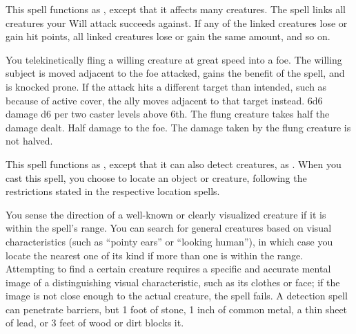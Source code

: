 \spelleffect This spell functions as , except that it affects many creatures. The spell links all creatures your Will attack succeeds against. If any of the linked creatures lose or gain hit points, all linked creatures lose or gain the same amount, and so on.

\spelleffect You telekinetically fling a willing creature at great speed into a foe. The willing subject is moved adjacent to the foe attacked, gains the benefit of the  spell, and is knocked prone. If the attack hits a different target than intended, such as because of active cover, the ally moves adjacent to that target instead.
\spellsuccess 6d6 damage \add d6 per two caster levels above 6th. The flung creature takes half the damage dealt.
\spellfailure Half damage to the foe. The damage taken by the flung creature is not halved.

\spellrng{\rngext}
\spelldur{\durlong \dismissable}
\spelleffect This spell functions as , except that it can also detect creatures, as . When you cast this spell, you choose to locate an object or creature, following the restrictions stated in the respective location spells.

\spellrng{\rngmed}
\spelldur{\durmed \dismissable}
\spelleffect You sense the direction of a well-known or clearly visualized creature if it is within the spell's range. You can search for general creatures based on visual characteristics (such as ``pointy ears'' or ``looking human''), in which case you locate the nearest one of its kind if more than one is within the range. Attempting to find a certain creature requires a specific and accurate mental image of a distinguishing visual characteristic, such as its clothes or face; if the image is not close enough to the actual creature, the spell fails.
\spellnotes A detection spell can penetrate barriers, but 1 foot of stone, 1 inch of common metal, a thin sheet of lead, or 3 feet of wood or dirt blocks it.

